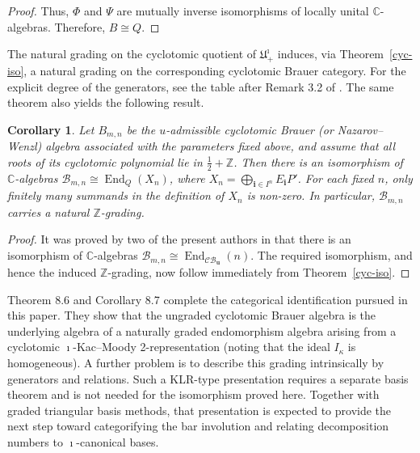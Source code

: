 \documentclass[a4,10pt]{amsart}
\numberwithin{equation}{section}
\def\End{\operatorname{End}}
\newtheorem{Cor}[Theorem]{Corollary}
\theoremstyle{definition}
\newcommand{\CB}{\mathcal{CB}}
\newcommand{\old}[1]{{\color{red} #1}}
\begin{document}
\begin{proof}
Thus, $\Phi$ and $\Psi$ are mutually inverse isomorphisms of
locally unital $\mathbb C$-algebras. Therefore,
\(
B\cong Q
\).
\end{proof}



The natural grading on the cyclotomic quotient of
$\mathfrak U^\imath_+$ induces, via Theorem~\ref{cyc-iso}, a natural
grading on the corresponding cyclotomic Brauer category. For the explicit degree of the generators, see the table after Remark 3.2 of \cite{BSWW-icate}. The same
theorem also yields the following result.

\begin{Cor}
\label{cor:cycb}
Let \(B_{m,n}\) be the \(u\)-admissible cyclotomic Brauer (or Nazarov–Wenzl) algebra associated with the parameters fixed above, and
assume that all roots of its cyclotomic polynomial lie in \(\frac12+\mathbb Z\).
 Then there is an isomorphism of
$\mathbb C$-algebras
$
\mathcal B_{m,n}
\cong
\End_{ Q}(X_n)$, where $
X_n=\bigoplus_{\mathbf i\in I^n}E_{\mathbf i}P'$. For each fixed $n$, only finitely many summands in the definition of $X_n$ is non-zero. 
In particular, $\mathcal B_{m,n}$ carries a natural
$\mathbb Z$-grading.
\end{Cor}

\begin{proof}
It was proved by two of the present authors in \cite[Theorem~C]{RS-cyc} that
there is an isomorphism of $\mathbb C$-algebras
$
\mathcal B_{m,n}
\cong
\End_{\CB_{\mathbf u}}(n)$.
The required isomorphism, and hence the induced
$\mathbb Z$-grading, now follow immediately from
Theorem~\ref{cyc-iso}.
\end{proof}



Theorem 8.6 and Corollary 8.7 complete the categorical identification pursued in this paper. They show that the ungraded cyclotomic Brauer algebra is the underlying algebra of a naturally graded endomorphism algebra arising from a cyclotomic $\imath$-Kac--Moody 2-representation (noting that the ideal $I_\kappa$ is homogeneous). A further problem is to describe this grading intrinsically by generators and relations. Such a KLR-type presentation requires a separate basis theorem and is not needed for the isomorphism proved here. Together with graded triangular basis methods, that presentation is expected to provide the next step toward categorifying the bar involution and relating decomposition numbers to $\imath$-canonical bases.
\end{document}
